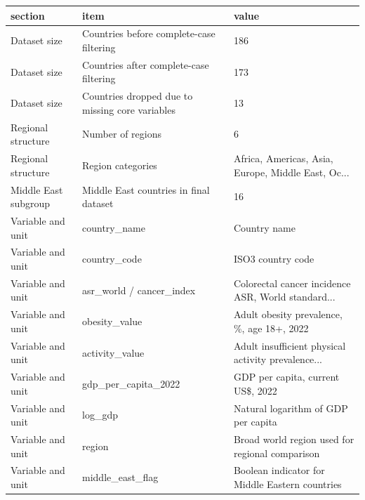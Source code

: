 \begin{tabular}{lll}
\toprule
             section &                                            item &                                              value \\
\midrule
        Dataset size &        Countries before complete-case filtering &                                                186 \\
        Dataset size &         Countries after complete-case filtering &                                                173 \\
        Dataset size & Countries dropped due to missing core variables &                                                 13 \\
  Regional structure &                               Number of regions &                                                  6 \\
  Regional structure &                               Region categories & Africa, Americas, Asia, Europe, Middle East, Oc... \\
Middle East subgroup &          Middle East countries in final dataset &                                                 16 \\
   Variable and unit &                                    country\_name &                                       Country name \\
   Variable and unit &                                    country\_code &                                  ISO3 country code \\
   Variable and unit &                        asr\_world / cancer\_index & Colorectal cancer incidence ASR, World standard... \\
   Variable and unit &                                   obesity\_value &         Adult obesity prevalence, \%, age 18+, 2022 \\
   Variable and unit &                                  activity\_value & Adult insufficient physical activity prevalence... \\
   Variable and unit &                             gdp\_per\_capita\_2022 &                  GDP per capita, current US\$, 2022 \\
   Variable and unit &                                         log\_gdp &                Natural logarithm of GDP per capita \\
   Variable and unit &                                          region &    Broad world region used for regional comparison \\
   Variable and unit &                                middle\_east\_flag &     Boolean indicator for Middle Eastern countries \\
\bottomrule
\end{tabular}
